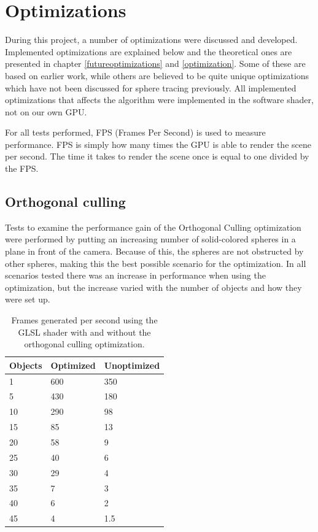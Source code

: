 	\section{Optimizations}
		
		During this project, a number of optimizations were discussed and
		developed. Implemented optimizations are explained below and the
		theoretical ones are presented in chapter \ref{futureoptimizations} and
		\ref{optimization}. Some of these are based on earlier work, while
		others are believed to be quite unique optimizations which have not been
		discussed for sphere tracing previously. All implemented optimizations
		that affects the algorithm were implemented in the software shader, not
		on our own GPU.

		For all tests performed, FPS (Frames Per Second) is used to measure
		performance. FPS is simply how many times the GPU is able to render 
		the scene per second. The time it takes to render the scene once is 
		equal to one divided by the FPS.

		\subsection{Orthogonal culling}
		
		Tests to examine the performance gain of the Orthogonal Culling optimization
		were performed by putting an increasing number of solid-colored spheres
		in a plane in front of the camera. Because of this, the spheres are not
		obstructed by other spheres, making this the best possible scenario for
		the optimization. In all scenarios tested there was an increase in 
		performance when using the optimization, but the increase varied with the 
		number of objects and how they were set up.

			\begin{table}
			\centering
			\begin{tabular}{lll}
				\hline
				Objects & Optimized & Unoptimized \\ 
				\hline
				1       & 600       & 350         \\ 
				5       & 430       & 180         \\			
				10      & 290       & 98          \\
				15      & 85        & 13          \\
				20      & 58        & 9           \\
				25      & 40        & 6           \\
				30      & 29        & 4           \\
				35      & 7         & 3           \\
				40      & 6         & 2           \\
				45      & 4         & 1.5         \\
				\hline
			\end{tabular}
			\caption{Frames generated per second using the GLSL shader with and
				without the orthogonal culling optimization.}
			\end{table}

